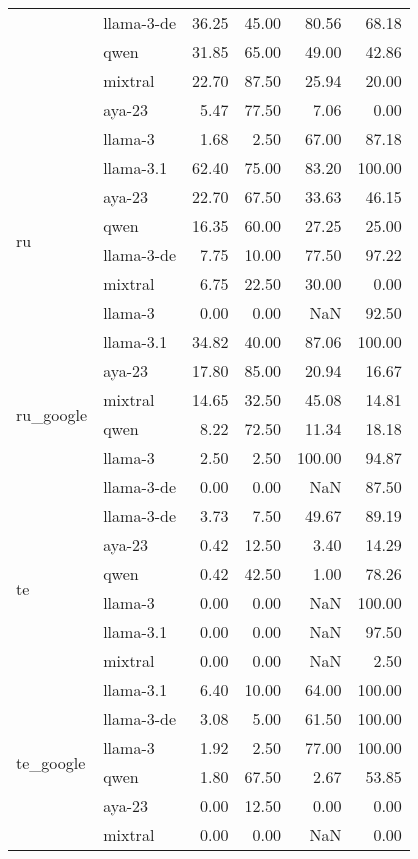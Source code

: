 \begin{tabular}{llrrrr}
 & llama-3-de & 36.25 & 45.00 & 80.56 & 68.18 \\
 & qwen & 31.85 & 65.00 & 49.00 & 42.86 \\
 & mixtral & 22.70 & 87.50 & 25.94 & 20.00 \\
 & aya-23 & 5.47 & 77.50 & 7.06 & 0.00 \\
 & llama-3 & 1.68 & 2.50 & 67.00 & 87.18 \\
\cline{1-6}
\multirow[t]{6}{*}{ru} & llama-3.1 & 62.40 & 75.00 & 83.20 & 100.00 \\
 & aya-23 & 22.70 & 67.50 & 33.63 & 46.15 \\
 & qwen & 16.35 & 60.00 & 27.25 & 25.00 \\
 & llama-3-de & 7.75 & 10.00 & 77.50 & 97.22 \\
 & mixtral & 6.75 & 22.50 & 30.00 & 0.00 \\
 & llama-3 & 0.00 & 0.00 & NaN & 92.50 \\
\cline{1-6}
\multirow[t]{6}{*}{ru_google} & llama-3.1 & 34.82 & 40.00 & 87.06 & 100.00 \\
 & aya-23 & 17.80 & 85.00 & 20.94 & 16.67 \\
 & mixtral & 14.65 & 32.50 & 45.08 & 14.81 \\
 & qwen & 8.22 & 72.50 & 11.34 & 18.18 \\
 & llama-3 & 2.50 & 2.50 & 100.00 & 94.87 \\
 & llama-3-de & 0.00 & 0.00 & NaN & 87.50 \\
\cline{1-6}
\multirow[t]{6}{*}{te} & llama-3-de & 3.73 & 7.50 & 49.67 & 89.19 \\
 & aya-23 & 0.42 & 12.50 & 3.40 & 14.29 \\
 & qwen & 0.42 & 42.50 & 1.00 & 78.26 \\
 & llama-3 & 0.00 & 0.00 & NaN & 100.00 \\
 & llama-3.1 & 0.00 & 0.00 & NaN & 97.50 \\
 & mixtral & 0.00 & 0.00 & NaN & 2.50 \\
\cline{1-6}
\multirow[t]{6}{*}{te_google} & llama-3.1 & 6.40 & 10.00 & 64.00 & 100.00 \\
 & llama-3-de & 3.08 & 5.00 & 61.50 & 100.00 \\
 & llama-3 & 1.92 & 2.50 & 77.00 & 100.00 \\
 & qwen & 1.80 & 67.50 & 2.67 & 53.85 \\
 & aya-23 & 0.00 & 12.50 & 0.00 & 0.00 \\
 & mixtral & 0.00 & 0.00 & NaN & 0.00 \\

\end{tabular}
